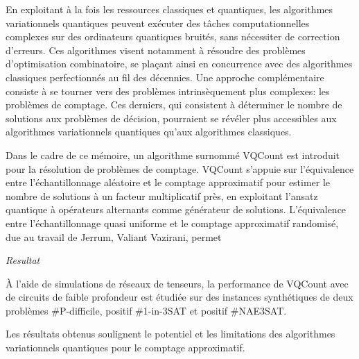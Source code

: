 \begin{comment}
\end{comment}

En exploitant à la fois les ressources classiques et quantiques, les algorithmes variationnels quantiques peuvent exécuter des tâches computationnelles complexes sur des ordinateurs quantiques bruités, sans nécessiter de correction d'erreurs. Ces algorithmes visent notamment à résoudre des problèmes d'optimisation combinatoire, se plaçant ainsi en concurrence avec des algorithmes classiques perfectionnés au fil des décennies. Une approche complémentaire consiste à se tourner vers des problèmes intrinsèquement plus complexes: les problèmes de comptage. Ces derniers, qui consistent à déterminer le nombre de solutions aux problèmes de décision, pourraient se révéler plus accessibles aux algorithmes variationnels quantiques qu'aux algorithmes classiques. 

Dans le cadre de ce mémoire, un algorithme surnommé VQCount est introduit pour la résolution de problèmes de comptage. VQCount s'appuie sur l'équivalence entre l'échantillonnage aléatoire et le comptage approximatif pour estimer le nombre de solutions à un facteur multiplicatif près, en exploitant l'ansatz quantique à opérateurs alternants comme générateur de solutions. L'équivalence entre l'échantillonnage quasi uniforme et le comptage approximatif randomisé, due au travail de Jerrum, Valiant Vazirani, permet 

\textcolor{mydarkred}{\textit{Resultat}}

À l'aide de simulations de réseaux de tenseurs, la performance de VQCount avec de circuits de faible profondeur est étudiée sur des instances synthétiques de deux problèmes \textsf{\#P}-difficile, positif \#1-in-3SAT et positif \#NAE3SAT. 

Les résultats obtenus soulignent le potentiel et les limitations des algorithmes variationnels quantiques pour le comptage approximatif. 

